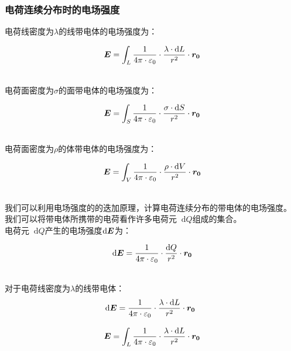 \documentclass[UTF8]{ctexart}
\newcommand*{\veb}[1]{\vb*{#1}}
\newcommand*{\dif}{\mathop{}\!\mathrm{d}}
\begin{document}
\subsubsection{电荷连续分布时的电场强度}
    \setcounter{equation}{0}
    电荷线密度为$\lambda$的线带电体的电场强度为：
    \begin{large}
        \begin{equation*}
            \veb{E}=\int_L\frac{1}{4\pi\cdot\varepsilon_0}\cdot\frac{\lambda\cdot\dif L}{r^2}\cdot\veb{r_0}
        \end{equation*}
    \end{large}\\
    电荷面密度为$\sigma$的面带电体的电场强度为：
    \begin{large}
        \begin{equation*}
            \veb{E}=\int_S\frac{1}{4\pi\cdot\varepsilon_0}\cdot\frac{\sigma\cdot\dif S}{r^2}\cdot\veb{r_0}
        \end{equation*}
    \end{large}\\
    电荷面密度为$\rho$的体带电体的电场强度为：
    \begin{large}
        \begin{equation*}
            \veb{E}=\int_V\frac{1}{4\pi\cdot\varepsilon_0}\cdot\frac{\rho\cdot\dif V}{r^2}\cdot\veb{r_0}
        \end{equation*}
    \end{large}\\
    我们可以利用电场强度的的迭加原理，计算电荷连续分布的带电体的电场强度。\\[3mm]
    我们可以将带电体所携带的电荷看作许多电荷元$\dif Q$组成的集合。\\[3mm]
    电荷元$\dif Q$产生的电场强度$\dif\veb{E}$为：
    \begin{large}
        \begin{equation*}
            \dif\veb{E}=\frac{1}{4\pi\cdot\varepsilon_0}\cdot\frac{\dif Q}{r^2}\cdot\veb{r_0}    
        \end{equation*}
    \end{large}\\
    对于电荷线密度为$\lambda$的线带电体：
    \begin{align}
        &\dif\veb{E}=\frac{1}{4\pi\cdot\varepsilon_0}\cdot\frac{\lambda\cdot\dif L}{r^2}\cdot\veb{r_0}\\[3mm]
        &\veb{E}=\int_L\frac{1}{4\pi\cdot\varepsilon_0}\cdot\frac{\lambda\cdot\dif L}{r^2}\cdot\veb{r_0}
    \end{align}\\
\end{document}
